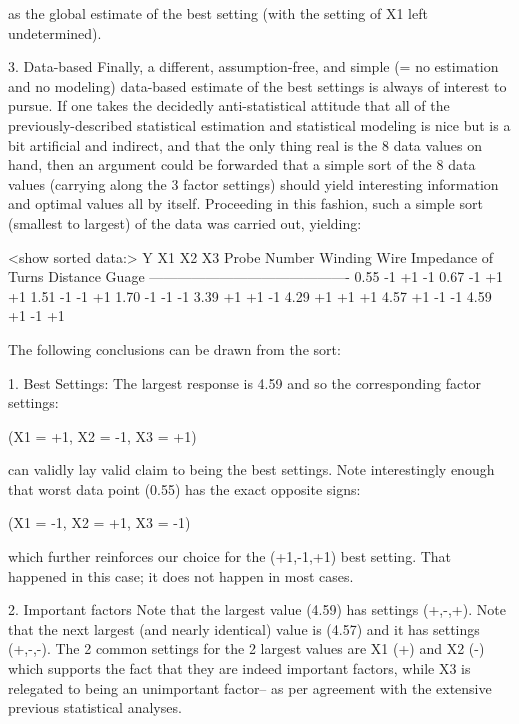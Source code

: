    as the global estimate of the best setting
   (with the setting of X1 left undetermined).

3. Data-based
   Finally, a different, assumption-free, and
   simple (= no estimation and no modeling)
   data-based estimate of the best settings is
   always of interest to pursue.  If one takes the
   decidedly anti-statistical attitude that all of
   the previously-described statistical estimation
   and statistical modeling is nice but is a bit
   artificial and indirect, and that the only
   thing real is the 8 data values on hand, then
   an argument could be forwarded that a simple
   sort of the 8 data values (carrying along the 3
   factor settings) should yield interesting
   information and optimal values all by itself.
   Proceeding in this fashion, such a simple sort
   (smallest to largest) of the data was carried
   out, yielding:

   <show sorted data:>
       Y         X1          X2          X3
     Probe     Number      Winding      Wire
   Impedance  of Turns     Distance     Guage
   -------------------------------------------
      0.55       -1          +1          -1
      0.67       -1          +1          +1
      1.51       -1          -1          +1
      1.70       -1          -1          -1
      3.39       +1          +1          -1
      4.29       +1          +1          +1
      4.57       +1          -1          -1
      4.59       +1          -1          +1

   The following conclusions can be drawn from the sort:

      1. Best Settings:
         The largest response is 4.59 and so the
         corresponding factor settings:

            (X1 = +1, X2 = -1, X3 = +1)

         can validly lay valid claim to being the
         best settings.  Note interestingly enough
         that worst data point (0.55) has the
         exact opposite signs:

            (X1 = -1, X2 = +1, X3 = -1)

         which further reinforces our choice for
         the (+1,-1,+1) best setting.  That
         happened in this case; it does not
         happen in most cases.

      2. Important factors
         Note that the largest value (4.59) has
         settings (+,-,+).  Note that the next
         largest (and nearly identical) value is
         (4.57) and it has settings (+,-,-).  The
         2 common settings for the 2 largest
         values are X1 (+) and X2 (-) which
         supports the fact that they are indeed
         important factors, while X3 is relegated
         to being an unimportant factor-- as per
         agreement with the extensive previous
         statistical analyses.

